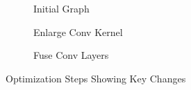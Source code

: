 \documentclass[12pt,a4paper,twoside,openright,bibliography=totocnumbered]{report}
\begin{document}
\begin{figure}[H]
    \centering
    \begin{subfigure}[b]{0.3\textwidth}
        \caption{Initial Graph}
        \label{fig:step1}
    \end{subfigure}
    \hfill
    \begin{subfigure}[b]{0.3\textwidth}
        \caption{Enlarge Conv Kernel}
        \label{fig:step2}
    \end{subfigure}
    \hfill
    \begin{subfigure}[b]{0.3\textwidth}
        \caption{Fuse Conv Layers}
        \label{fig:step3}
    \end{subfigure}
    \caption{Optimization Steps Showing Key Changes}
    \label{fig:optimization_steps}
\end{figure}
\end{document}
